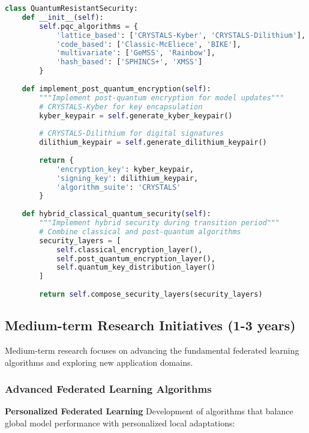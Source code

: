 \begin{lstlisting}[language=python, caption=Quantum-Resistant Security]
class QuantumResistantSecurity:
    def __init__(self):
        self.pqc_algorithms = {
            'lattice_based': ['CRYSTALS-Kyber', 'CRYSTALS-Dilithium'],
            'code_based': ['Classic-McEliece', 'BIKE'],
            'multivariate': ['GeMSS', 'Rainbow'],
            'hash_based': ['SPHINCS+', 'XMSS']
        }
        
    def implement_post_quantum_encryption(self):
        """Implement post-quantum encryption for model updates"""
        # CRYSTALS-Kyber for key encapsulation
        kyber_keypair = self.generate_kyber_keypair()
        
        # CRYSTALS-Dilithium for digital signatures
        dilithium_keypair = self.generate_dilithium_keypair()
        
        return {
            'encryption_key': kyber_keypair,
            'signing_key': dilithium_keypair,
            'algorithm_suite': 'CRYSTALS'
        }
        
    def hybrid_classical_quantum_security(self):
        """Implement hybrid security during transition period"""
        # Combine classical and post-quantum algorithms
        security_layers = [
            self.classical_encryption_layer(),
            self.post_quantum_encryption_layer(),
            self.quantum_key_distribution_layer()
        ]
        
        return self.compose_security_layers(security_layers)
\end{lstlisting}

\subsection{Medium-term Research Initiatives (1-3 years)}

Medium-term research focuses on advancing the fundamental federated learning algorithms and exploring new application domains.

\subsubsection{Advanced Federated Learning Algorithms}

\textbf{Personalized Federated Learning}
Development of algorithms that balance global model performance with personalized local adaptations:

